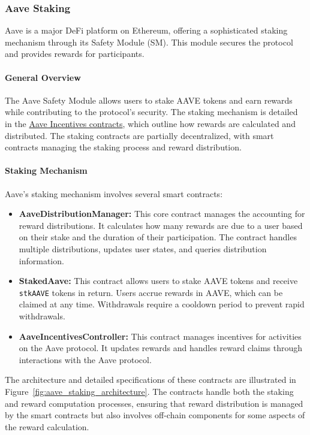 \documentclass[12pt,parskip=full, tikz]{article}
\begin{document}
\subsubsection{Aave Staking}

Aave is a major DeFi platform on Ethereum, offering a sophisticated staking mechanism through its Safety Module (SM). This module secures the protocol and provides rewards for participants.

\paragraph{General Overview}
The Aave Safety Module allows users to stake AAVE tokens and earn rewards while contributing to the protocol’s security. The staking mechanism is detailed in the
\href{https://github.com/aave/aave-stake-v2}{Aave Incentives contracts}, which outline how rewards are calculated and distributed. The staking contracts are partially decentralized, with smart contracts managing the staking process and reward distribution.

\paragraph{Staking Mechanism}
Aave’s staking mechanism involves several smart contracts:

\begin{itemize}
    \item \textbf{AaveDistributionManager:} This core contract manages the accounting for reward distributions. It calculates how many rewards are due to a user based on their stake and the duration of their participation. The contract handles multiple distributions, updates user states, and queries distribution information.
    \item \textbf{StakedAave:} This contract allows users to stake AAVE tokens and receive \texttt{stkAAVE} tokens in return. Users accrue rewards in AAVE, which can be claimed at any time. Withdrawals require a cooldown period to prevent rapid withdrawals.
    \item \textbf{AaveIncentivesController:} This contract manages incentives for activities on the Aave protocol. It updates rewards and handles reward claims through interactions with the Aave protocol.
\end{itemize}

The architecture and detailed specifications of these contracts are illustrated in Figure~\ref{fig:aave_staking_architecture}. The contracts handle both the staking and reward computation processes, ensuring that reward distribution is managed by the smart contracts but also involves off-chain components for some aspects of the reward calculation.
\end{document}
